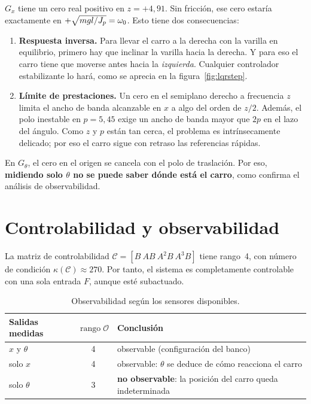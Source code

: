 $G_x$ tiene un cero real positivo en $z=+4{,}91$. Sin fricción, ese cero estaría exactamente en $+\sqrt{mgl/J_p}=\omega_0$. Esto tiene dos consecuencias:

\begin{enumerate}
  \item \textbf{Respuesta inversa.} Para llevar el carro a la derecha con la varilla en equilibrio, primero hay que inclinar la varilla hacia la derecha. Y para eso el carro tiene que moverse antes hacia la \emph{izquierda}. Cualquier controlador estabilizante lo hará, como se aprecia en la figura~\ref{fig:lqrstep}.
  \item \textbf{Límite de prestaciones.} Un cero en el semiplano derecho a frecuencia $z$ limita el ancho de banda alcanzable en $x$ a algo del orden de $z/2$. Además, el polo inestable en $p=5{,}45$ exige un ancho de banda mayor que $2p$ en el lazo del ángulo. Como $z$ y $p$ están tan cerca, el problema es intrínsecamente delicado; por eso el carro sigue con retraso las referencias rápidas.
\end{enumerate}

En $G_\theta$, el cero en el origen se cancela con el polo de traslación. Por eso, \textbf{midiendo solo $\theta$ no se puede saber dónde está el carro}, como confirma el análisis de observabilidad.

\section{Controlabilidad y observabilidad}

La matriz de controlabilidad $\mathcal{C}=[B\ AB\ A^2B\ A^3B]$ tiene rango~4, con número de condición $\kappa(\mathcal C)\approx 270$. Por tanto, el sistema es completamente controlable con una sola entrada $F$, aunque esté subactuado.

\begin{table}[H]
\centering\small
\begin{tabular}{@{}lcl@{}}
\toprule
Salidas medidas & $\operatorname{rango}\mathcal{O}$ & Conclusión\\
\midrule
$x$ y $\theta$ & 4 & observable (configuración del banco)\\
solo $x$ & 4 & observable: $\theta$ se deduce de cómo reacciona el carro\\
solo $\theta$ & 3 & \textbf{no observable}: la posición del carro queda indeterminada\\
\bottomrule
\end{tabular}
\caption{Observabilidad según los sensores disponibles.}
\end{table}


